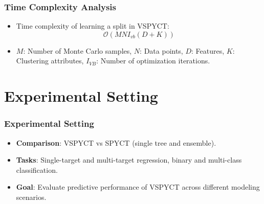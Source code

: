 \documentclass{beamer}
\begin{document}
\begin{frame}
  \frametitle{Time Complexity Analysis}
  \begin{itemize}
    \item Time complexity of learning a split in VSPYCT:
    \[
    \mathcal{O}(MNI_{vb}(D+K))
    \]
    \item $M$: Number of Monte Carlo samples, $N$: Data points, $D$: Features, $K$: Clustering attributes, $I_{VB}$: Number of optimization iterations.
  \end{itemize}
\end{frame}

\section{Experimental Setting}
\begin{frame}
  \frametitle{Experimental Setting}
  \begin{itemize}
    \item \textbf{Comparison}: VSPYCT vs SPYCT (single tree and ensemble).
    \item \textbf{Tasks}: Single-target and multi-target regression, binary and multi-class classification.
    \item \textbf{Goal}: Evaluate predictive performance of VSPYCT across different modeling scenarios.
  \end{itemize}
\end{frame}
\end{document}
